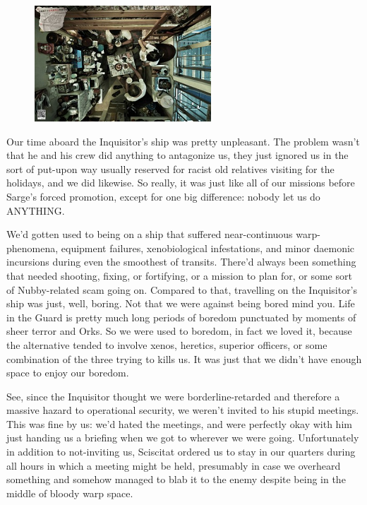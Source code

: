 \begin{figure}
	\begin{center}
		\includegraphics[width=\figwidth]{pics/17/21.png}
	\end{center}
\end{figure}
Our time aboard the Inquisitor's ship was pretty unpleasant. 
The problem wasn't that he and his crew did anything to antagonize us, they just ignored us in the sort of put-upon way usually reserved for racist old relatives visiting for the holidays, and we did likewise. 
So really, it was just like all of our missions before Sarge's forced promotion, except for one big difference: 
nobody let us do ANYTHING.

We'd gotten used to being on a ship that suffered near-continuous warp-phenomena, equipment failures, xenobiological infestations, and minor daemonic incursions during even the smoothest of transits. 
There'd always been something that needed shooting, fixing, or fortifying, or a mission to plan for, or some sort of Nubby-related scam going on. 
Compared to that, travelling on the Inquisitor's ship was just, well, boring. 
Not that we were against being bored mind you. 
Life in the Guard is pretty much long periods of boredom punctuated by moments of sheer terror and Orks. 
So we were used to boredom, in fact we loved it, because the alternative tended to involve xenos, heretics, superior officers, or some combination of the three trying to kills us. 
It was just that we didn't have enough space to enjoy our boredom.

See, since the Inquisitor thought we were borderline-retarded and therefore a massive hazard to operational security, we weren't invited to his stupid meetings. 
This was fine by us: 
we'd hated the meetings, and were perfectly okay with him just handing us a briefing when we got to wherever we were going. 
Unfortunately in addition to not-inviting us, Sciscitat ordered us to stay in our quarters during all hours in which a meeting might be held, presumably in case we overheard something and somehow managed to blab it to the enemy despite being in the middle of bloody warp space.

